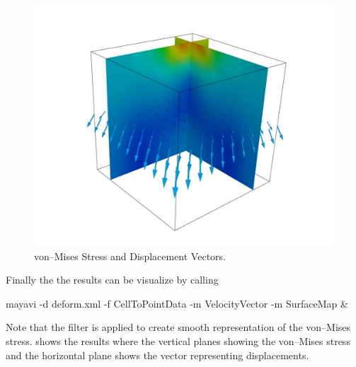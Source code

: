 \begin{figure}
\centerline{\includegraphics[width=\figwidth]{figures/HeatedBlock}}
\caption{von--Mises Stress and Displacement Vectors.}
\label{HEATEDBLOCK FIG 2}
\end{figure}

Finally the the results can be visualize by calling
\begin{python}
mayavi -d deform.xml -f CellToPointData -m VelocityVector -m SurfaceMap &
\end{python}
Note that the filter  is applied to create smooth representation of the 
von--Mises stress.  shows the results where the vertical planes showing the 
von--Mises stress and the horizontal plane shows the vector representing displacements.

